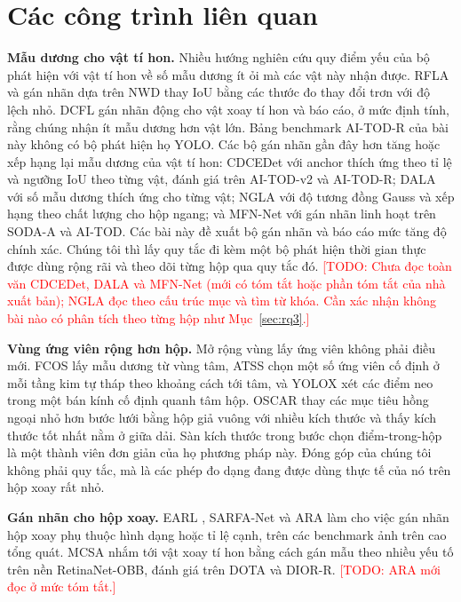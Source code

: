 \documentclass[11pt]{article}
\newcommand{\todo}[1]{\textcolor{red}{[TODO: #1]}}
\begin{document}
\section{Các công trình liên quan}
\textbf{Mẫu dương cho vật tí hon.} Nhiều hướng nghiên cứu quy điểm yếu của bộ phát hiện với vật tí hon về số mẫu dương ít ỏi
mà các vật này nhận được. RFLA \cite{rfla} và gán nhãn dựa trên NWD \cite{aitodv2} thay IoU bằng các thước đo thay đổi trơn với
độ lệch nhỏ. DCFL \cite{aitodr} gán nhãn động cho vật xoay tí hon và báo cáo, ở mức định tính, rằng chúng nhận ít mẫu dương hơn
vật lớn. Bảng benchmark AI-TOD-R của bài này không có bộ phát hiện họ YOLO. Các bộ gán nhãn gần đây hơn tăng hoặc xếp hạng lại
mẫu dương của vật tí hon: CDCEDet \cite{cdcedet} với anchor thích ứng theo tỉ lệ và ngưỡng IoU theo từng vật, đánh giá trên
AI-TOD-v2 và AI-TOD-R; DALA \cite{dala} với số mẫu dương thích ứng cho từng vật; NGLA \cite{ngla} với độ tương đồng Gauss và xếp
hạng theo chất lượng cho hộp ngang; và MFN-Net \cite{mfnnet} với gán nhãn linh hoạt trên SODA-A và AI-TOD. Các bài này đề xuất
bộ gán nhãn và báo cáo mức tăng độ chính xác. Chúng tôi thì lấy quy tắc đi kèm một bộ phát hiện thời gian thực được dùng rộng
rãi và theo dõi từng hộp qua quy tắc đó. \todo{Chưa đọc toàn văn CDCEDet, DALA và MFN-Net (mới có tóm tắt hoặc phần tóm tắt
của nhà xuất bản); NGLA đọc theo cấu trúc mục và tìm từ khóa. Cần xác nhận không bài nào có phân tích theo từng hộp như
Mục~\ref{sec:rq3}.}

\textbf{Vùng ứng viên rộng hơn hộp.} Mở rộng vùng lấy ứng viên không phải điều mới. FCOS \cite{fcos} lấy mẫu dương từ vùng tâm,
ATSS \cite{atss} chọn một số ứng viên cố định ở mỗi tầng kim tự tháp theo khoảng cách tới tâm, và YOLOX \cite{yolox} xét các
điểm neo trong một bán kính cố định quanh tâm hộp. OSCAR \cite{oscar} thay các mục tiêu hồng ngoại nhỏ hơn bước lưới bằng hộp
giả vuông với nhiều kích thước và thấy kích thước tốt nhất nằm ở giữa dải. Sàn kích thước trong bước chọn điểm-trong-hộp là
một thành viên đơn giản của họ phương pháp này. Đóng góp của chúng tôi không phải quy tắc, mà là các phép đo dạng đang được
dùng thực tế của nó trên hộp xoay rất nhỏ.

\textbf{Gán nhãn cho hộp xoay.} EARL \cite{earl}, SARFA-Net \cite{sarfa} và ARA \cite{ara} làm cho việc gán nhãn hộp xoay phụ
thuộc hình dạng hoặc tỉ lệ cạnh, trên các benchmark ảnh trên cao tổng quát. MCSA \cite{mcsa} nhắm tới vật xoay tí hon bằng cách
gán mẫu theo nhiều yếu tố trên nền RetinaNet-OBB, đánh giá trên DOTA và DIOR-R. \todo{ARA mới đọc ở mức tóm tắt.}
\end{document}
